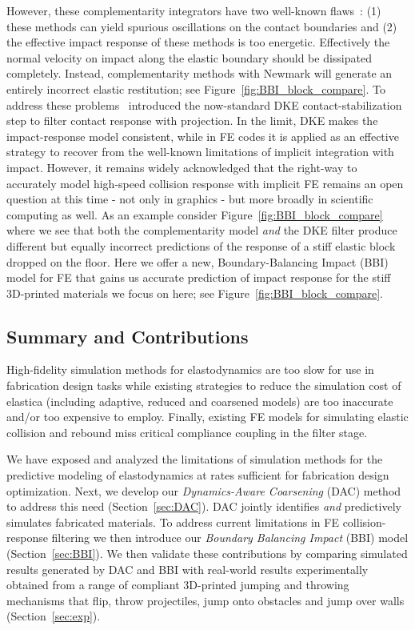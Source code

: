 However, these complementarity integrators have two well-known flaws~\cite{Deuflhard:2008fu}: (1) these methods can yield spurious oscillations on the contact boundaries and (2) the effective impact response of these methods is too energetic. Effectively the normal velocity on impact along the elastic boundary should be dissipated completely. Instead, complementarity methods with Newmark will generate an entirely incorrect elastic restitution; see Figure~\ref{fig:BBI_block_compare}. To address these problems~\citet{Deuflhard:2008fu} introduced the now-standard DKE contact-stabilization step to filter contact response with projection. In the limit, DKE makes the impact-response model consistent,
while in FE codes it is applied as an effective strategy to recover from the well-known limitations of implicit integration with impact. However, it remains widely acknowledged that the right-way to accurately model high-speed collision response with implicit FE remains an open question at this time - not only in graphics - but more broadly in scientific computing as well. As an example consider Figure~\ref{fig:BBI_block_compare} where we see that both the complementarity model \emph{and} the DKE filter produce different but equally incorrect predictions of the response of a stiff elastic block dropped on the floor. Here we offer a new, Boundary-Balancing Impact (BBI) model for FE that gains us accurate prediction of impact response for the stiff 3D-printed materials we focus on here; see Figure~\ref{fig:BBI_block_compare}.

\subsection{Summary and Contributions}
High-fidelity simulation methods for elastodynamics are too slow for use in fabrication design tasks while existing strategies to reduce the simulation cost of elastica (including adaptive, reduced and coarsened models) are too inaccurate and/or too expensive to employ. Finally, existing FE models for simulating elastic collision and rebound miss critical compliance coupling in the filter stage.

We have exposed and analyzed the limitations of simulation methods for the predictive modeling of elastodynamics at rates sufficient for fabrication design optimization. Next, we develop our \emph{Dynamics-Aware Coarsening} (DAC) method to address this need (Section~\ref{sec:DAC}).
DAC jointly identifies \emph{and} predictively simulates fabricated materials. To address current limitations in FE collision-response filtering we then introduce our \emph{Boundary Balancing Impact} (BBI) model (Section~\ref{sec:BBI}).
We then validate these contributions by comparing simulated results generated by DAC and BBI with real-world results experimentally obtained from a range of compliant 3D-printed jumping and throwing mechanisms that flip, throw projectiles, jump onto obstacles and jump over walls (Section~\ref{sec:exp}).
